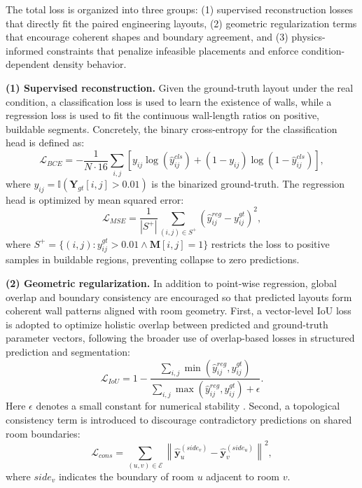 The total loss is organized into three groups: (1) supervised reconstruction losses that directly fit the paired engineering layouts, (2) geometric regularization terms that encourage coherent shapes and boundary agreement, and (3) physics-informed constraints that penalize infeasible placements and enforce condition-dependent density behavior.

\textbf{(1) Supervised reconstruction.} Given the ground-truth layout under the real condition, a classification loss is used to learn the existence of walls, while a regression loss is used to fit the continuous wall-length ratios on positive, buildable segments.
Concretely, the binary cross-entropy for the classification head is defined as:
\begin{equation}
\mathcal{L}_{BCE} = -\frac{1}{N \cdot 16}\sum_{i,j}\left[y_{ij}\log(\hat{y}_{ij}^{cls}) + (1-y_{ij})\log(1-\hat{y}_{ij}^{cls})\right],
\label{eq:loss_bce}
\end{equation}
where $y_{ij} = \mathbb{I}(\mathbf{Y}_{gt}[i,j] > 0.01)$ is the binarized ground-truth.
The regression head is optimized by mean squared error:
\begin{equation}
\mathcal{L}_{MSE} = \frac{1}{|S^+|}\sum_{(i,j) \in S^+}(\hat{y}_{ij}^{reg} - y_{ij}^{gt})^2,
\label{eq:loss_mse}
\end{equation}
where $S^+ = \{(i,j) : y_{ij}^{gt} > 0.01 \land \mathbf{M}[i,j] = 1\}$ restricts the loss to positive samples in buildable regions, preventing collapse to zero predictions.

\textbf{(2) Geometric regularization.} In addition to point-wise regression, global overlap and boundary consistency are encouraged so that predicted layouts form coherent wall patterns aligned with room geometry.
First, a vector-level IoU loss is adopted to optimize holistic overlap between predicted and ground-truth parameter vectors, following the broader use of overlap-based losses in structured prediction and segmentation:
\begin{equation}
\mathcal{L}_{IoU} = 1 - \frac{\sum_{i,j}\min(\hat{y}_{ij}^{reg}, y_{ij}^{gt})}{\sum_{i,j}\max(\hat{y}_{ij}^{reg}, y_{ij}^{gt}) + \epsilon}.
\label{eq:loss_iou}
\end{equation}
Here $\epsilon$ denotes a small constant for numerical stability \cite{huangBatchingSoftIoU2020,zhaoRethinkingDiceLoss2020}.
Second, a topological consistency term is introduced to discourage contradictory predictions on shared room boundaries:
\begin{equation}
\mathcal{L}_{cons} = \sum_{(u,v) \in \mathcal{E}} \left\|\hat{\mathbf{y}}_u^{(side_v)} - \hat{\mathbf{y}}_v^{(side_u)}\right\|^2,
\label{eq:loss_cons}
\end{equation}
where $side_v$ indicates the boundary of room $u$ adjacent to room $v$.

